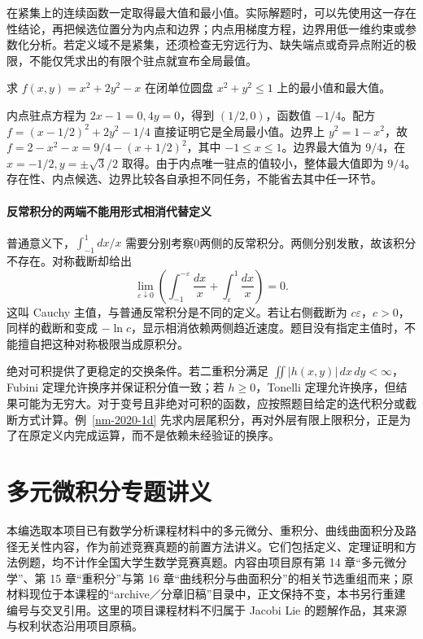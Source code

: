 \documentclass[UTF8,12pt,a4paper,fontset=fandol]{ctexart}
\begin{document}
在紧集上的连续函数一定取得最大值和最小值。实际解题时，可以先使用这一存在性结论，再把候选位置分为内点和边界；内点用梯度方程，边界用低一维约束或参数化分析。若定义域不是紧集，还须检查无穷远行为、缺失端点或奇异点附近的极限，不能仅凭求出的有限个驻点就宣布全局最值。

\begin{example}
求 $f(x,y)=x^2+2y^2-x$ 在闭单位圆盘 $x^2+y^2\leq1$ 上的最小值和最大值。
\end{example}
\begin{solve}
内点驻点方程为 $2x-1=0,4y=0$，得到 $(1/2,0)$，函数值 $-1/4$。配方 $f=(x-1/2)^2+2y^2-1/4$ 直接证明它是全局最小值。边界上 $y^2=1-x^2$，故 $f=2-x^2-x=9/4-(x+1/2)^2$，其中 $-1\leq x\leq1$。边界最大值为 $9/4$，在 $x=-1/2,y=\pm\sqrt3/2$ 取得。由于内点唯一驻点的值较小，整体最大值即为 $9/4$。存在性、内点候选、边界比较各自承担不同任务，不能省去其中任一环节。
\end{solve}

\subsection{反常积分的两端不能用形式相消代替定义}
普通意义下，$\int_{-1}^1dx/x$ 需要分别考察0两侧的反常积分。两侧分别发散，故该积分不存在。对称截断却给出
\[
 \lim_{\varepsilon\downarrow0}
 \left(\int_{-1}^{-\varepsilon}\frac{dx}{x}
       +\int_{\varepsilon}^1\frac{dx}{x}\right)=0.
\]
这叫 Cauchy 主值，与普通反常积分是不同的定义。若让右侧截断为 $c\varepsilon$，$c>0$，同样的截断和变成 $-\ln c$，显示相消依赖两侧趋近速度。题目没有指定主值时，不能擅自把这种对称极限当成原积分。

绝对可积提供了更稳定的交换条件。若二重积分满足 $\iint|h(x,y)|\,dx\,dy<\infty$，Fubini 定理允许换序并保证积分值一致；若 $h\geq0$，Tonelli 定理允许换序，但结果可能为无穷大。对于变号且非绝对可积的函数，应按照题目给定的迭代积分或截断方式计算。例~\ref{nm-2020-1d} 先求内层尾积分，再对外层有限上限积分，正是为了在原定义内完成运算，而不是依赖未经验证的换序。


\part{多元微积分专题讲义}

本编选取本项目已有数学分析课程材料中的多元微分、重积分、曲线曲面积分及路径无关性内容，作为前述竞赛真题的前置方法讲义。它们包括定义、定理证明和方法例题，均不计作全国大学生数学竞赛真题。内容由项目原有第 14 章“多元微分学”、第 15 章“重积分”与第 16 章“曲线积分与曲面积分”的相关节选重组而来；原材料现位于本课程的“archive／分章旧稿”目录中，正文保持不变，本书另行重建编号与交叉引用。这里的项目课程材料不归属于 Jacobi Lie 的题解作品，其来源与权利状态沿用项目原稿。
\end{document}
